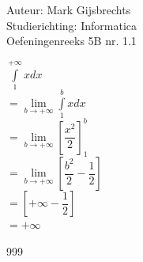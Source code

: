 \documentclass[a4paper]{article}
\newcommand{\dint}{\displaystyle\int}
\begin{document}
\noindent \large Auteur: Mark Gijsbrechts \\
\noindent \large Studierichting: Informatica\\
\noindent \large Oefeningenreeks 5B nr. 1.1\\

\medskip

\normalsize





$ \dint\limits_{1}^{+\infty} x dx  $ \\

$= \lim\limits_{b \to +\infty} \dint\limits_{1}^{b} x dx  $ \\

$= \lim\limits_{b \to +\infty}\left[ \dfrac{x^2}{2} \right]_{1}^{b}  $ \\

$= \lim\limits_{b \to +\infty}\left[ \dfrac{b^2}{2} - \dfrac{1}{2} \right]  $ \\

$= \left[ +\infty - \dfrac{1}{2} \right]  $ \\

$= +\infty  $ \\




\begin{thebibliography}{999}
\end{thebibliography}
\end{document}
